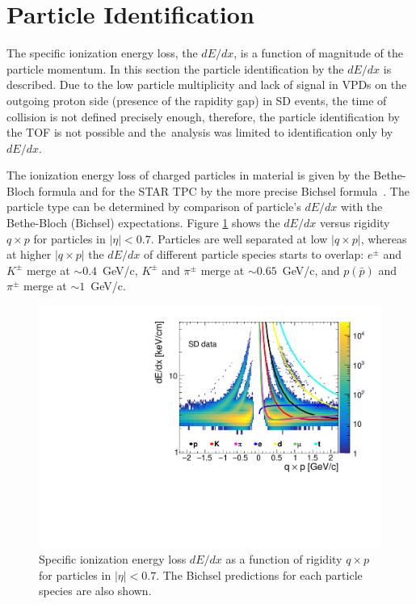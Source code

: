 \section{Particle Identification}\label{section:star_PIDdEdx}

The specific ionization energy loss, the $dE/dx$, is a function of magnitude of the
particle momentum.  In this section the particle identification by the $dE/dx$  is described.
 Due to the low particle multiplicity and lack of signal in VPDs on the outgoing proton side (presence of the rapidity gap) in SD events, the time of collision is not defined precisely enough, therefore, the particle identification  by the TOF is not possible
and the~analysis was limited to identification only by $dE/dx$. 

The ionization energy loss of charged particles in material
is given by the Bethe-Bloch formula and for
the STAR \ac{TPC} by the more precise Bichsel formula~\cite{Bichsel:2006cs}.
The particle type can be determined by comparison of particle's $dE/dx$ with the Bethe-Bloch (Bichsel) expectations.
Figure \ref{fig:star_dedx} shows the  $dE/dx$ versus rigidity $q\times p$ for particles in $|\eta| < 0.7$. Particles are  well separated at low $|q\times p|$, whereas at higher $|q\times p|$ the $dE/dx$ of different particle species starts to
overlap: $e^\pm$ and $K^\pm$ merge at $\sim0.4$~GeV/c, $K^\pm$ and
$\pi^\pm$ merge at $\sim0.65$~GeV/c, and $p(\bar{p})$ and $\pi^\pm$ merge
at $\sim1$~GeV/c. 
\begin{figure}[h!]
	\centering
	\includegraphics[width=0.8\linewidth, page=1]{chapters/chrgSTAR/img/dEdx/SDT_dEdx.pdf}
	\caption[Specific ionization
	energy loss $dE/dx$ as a function of rigidity $q\times p$ for particles
	in $|\eta| < 0.7$]{Specific ionization
		energy loss $dE/dx$ as a function of rigidity $q\times p$ for particles
		in $|\eta| < 0.7$. The Bichsel predictions for each particle species are also shown.}
	\label{fig:star_dedx}
\end{figure} 
